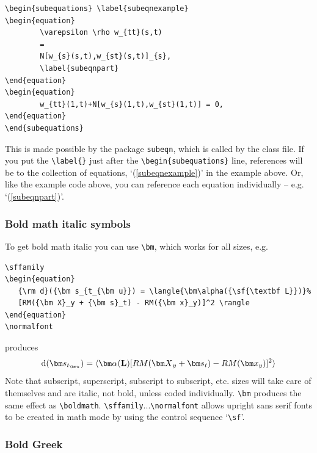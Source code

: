 \documentclass{tADR2e}
\begin{document}
\begin{verbatim}
\begin{subequations} \label{subeqnexample}
\begin{equation}
        \varepsilon \rho w_{tt}(s,t)
        =
        N[w_{s}(s,t),w_{st}(s,t)]_{s},
        \label{subeqnpart}
\end{equation}
\begin{equation}
        w_{tt}(1,t)+N[w_{s}(1,t),w_{st}(1,t)] = 0,
\end{equation}
\end{subequations}
\end{verbatim}
This is made possible by the package {\tt{subeqn}}, which is called
by the class file. If you put the \verb"\label{}" just after the
\verb"\begin{subequations}" line, references will be to the
collection of equations, `(\ref{subeqnexample})' in the example
above. Or, like the example code above, you can reference each
equation individually -- e.g. `(\ref{subeqnpart})'.


\subsubsection{Bold math italic symbols}

To get bold math italic you can use \verb"\bm", which works for
all sizes, e.g.
%
\begin{verbatim}
\sffamily
\begin{equation}
   {\rm d}({\bm s_{t_{\bm u}}) = \langle{\bm\alpha({\sf{\textbf L}})}%
   [RM({\bm X}_y + {\bm s}_t) - RM({\bm x}_y)]^2 \rangle
\end{equation}
\normalfont
\end{verbatim}
%
produces\sffamily
\begin{equation}
   {\rm d}({\bm s_{t_{\bm u}}}) = \langle {\bm\alpha({\sf{\textbf L}})}[RM({\bm X}_y
   + {\bm s}_t) - RM({\bm x}_y)]^2 \rangle
\end{equation}\normalfont
Note that subscript, superscript, subscript to subscript, etc.
sizes will take care of themselves and are italic, not bold,
unless coded individually. \verb"\bm" produces the same effect as
\verb"\boldmath". \verb"\sffamily"...\verb"\normalfont" allows
upright sans serif fonts to be created in math mode by using the
control sequence `\verb"\sf"'.


\subsubsection{Bold Greek}\label{boldgreek}
\end{document}
